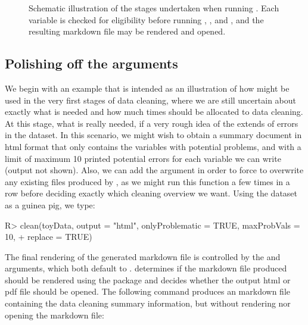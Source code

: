 \documentclass[article,shortnames]{jss}
\begin{document}
\begin{figure}[tb]
\caption{Schematic illustration of the stages undertaken when running
  . Each variable is checked for eligibility before
  running , , and , and the
  resulting  markdown file may be rendered and opened.}
\label{figure:cleanStructure}
\end{figure}





\subsection{Polishing off the arguments}
We begin with an example that is intended as an illustration of how  might
be used in the very first stages of data cleaning, where we are still uncertain
about exactly what is needed and how much times should be allocated to data
cleaning. At this stage, what is really needed, if a very rough idea of the extends of
errors in the dataset. In this scenario, we might wish to obtain a summary document in html format
that only contains the variables with potential problems, and with a limit of
maximum 10 printed potential errors for each variable we can write
(output not shown). Also, we can add the argument  in
order to force  to overwrite any existing files produced by
, as we might run this function a few times in a row before deciding
exactly which cleaning overview we want. Using the  dataset as a guinea pig, we type:

\begin{Schunk}
\begin{Sinput}
R> clean(toyData, output = "html", onlyProblematic = TRUE, maxProbVals = 10,
+    replace = TRUE)
\end{Sinput}
\end{Schunk}

The final rendering of the generated markdown file is controlled by
the  and  arguments, which both default to
.  determines if the  markdown file
produced should be rendered using the  \citep{rmarkdown} package and
 decides whether the output html or pdf file should be
opened. The following command produces an  markdown file
containing the data cleaning summary information, but without
rendering nor opening the markdown file:
\end{document}
